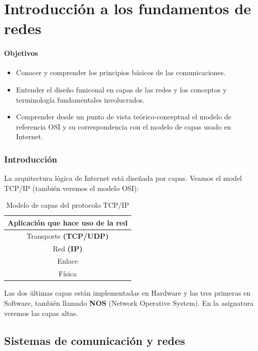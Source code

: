 \chapter{Introducción a los fundamentos de redes}
\subsubsection{Objetivos}
\begin{itemize}
    \item Conocer y comprender los principios básicos de las comunicaciones.
    \item Entender el diseño funiconal en capas de las redes y los conceptos y terminología fundamentales involucrados. 
    \item Comprender desde un punto de vista teórico-conceptual el modelo de referencia OSI y su correspondencia con el modelo de capas usado en Internet.
\end{itemize}

\subsection{Introducción}
La arquitectura lógica de Internet está diseñada por capas. Veamos el model TCP/IP (también veremos el modelo OSI):
\begin{table}[h]
    \centering
    \begin{tabular}{|c|}
        \hline
        Aplicación que hace uso de la red\\ \hline
        Transporte \textbf{(TCP/UDP)} \\ \hline
        Red \textbf{(IP)} \\ \hline
        Enlace \\ \hline
        Física \\ \hline
    \end{tabular}
    \caption{Modelo de capas del protocolo TCP/IP}
    \label{table:_tabla_de_capas}
\end{table}

Las dos últimas capas están implementadas en Hardware y las tres primeras en Software, también llamado \textbf{NOS} (Network Operative System). En la asignatura veremos las capas altas. 

\section{Sistemas de comunicación y redes}

